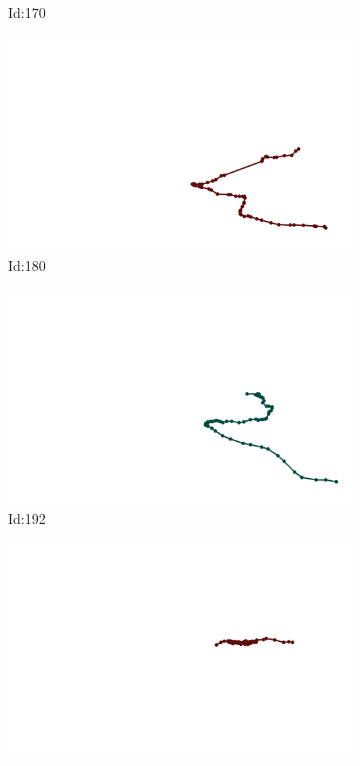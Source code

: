 \documentclass[12pt,twoside]{report}
\begin{document}
\begin{figure}
\begin{subfigure}[b]{0.20\textwidth}
\caption{Id:170}
\end{subfigure}
\begin{subfigure}[b]{0.20\textwidth}
\centering
\includegraphics[width=\textwidth]{../trajectories/180.png}
\caption{Id:180}
\end{subfigure}
\begin{subfigure}[b]{0.20\textwidth}
\centering
\includegraphics[width=\textwidth]{../trajectories/192.png}
\caption{Id:192}
\end{subfigure}
\begin{subfigure}[b]{0.20\textwidth}
\centering
\includegraphics[width=\textwidth]{../trajectories/250.png}

\end{subfigure}
\end{figure}
\end{document}
